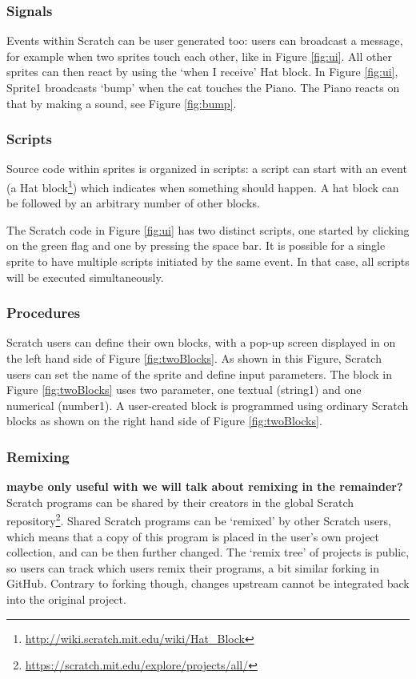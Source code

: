 \documentclass{sig-alternate}
\newcommand{\todo}[1]{\textbf{#1}}
\begin{document}
\subsubsection{Signals}
Events within Scratch can be user generated too: users can broadcast a message, for example when two sprites touch each other, like in Figure \ref{fig:ui}. All other sprites can then react by using the `when I receive' Hat block. In Figure \ref{fig:ui}, Sprite1 broadcasts `bump' when the cat touches the Piano. The Piano reacts on that by making a sound, see Figure \ref{fig:bump}.

\subsubsection{Scripts}
Source code within sprites is organized in scripts: a script can start with an event (a Hat block\footnote{\url{http://wiki.scratch.mit.edu/wiki/Hat_Block}}) which indicates when something should happen. A hat block can be followed by an arbitrary number of other blocks. 

The Scratch code in Figure \ref{fig:ui} has two distinct scripts, one started by clicking on the green flag and one by pressing the space bar. It is possible for a single sprite to have multiple scripts initiated by the same event. In that case, all scripts will be executed simultaneously.

\subsubsection{Procedures}
Scratch users can define their own blocks, with a pop-up screen displayed in on the left hand side of Figure \ref{fig:twoBlocks}. As shown in this Figure, Scratch users can set the name of the sprite and define input parameters. The block in Figure \ref{fig:twoBlocks} uses two parameter, one textual (string1) and one numerical (number1). A user-created block is programmed using ordinary Scratch blocks as shown on the right hand side of Figure \ref{fig:twoBlocks}.

\subsubsection{Remixing}
\todo{maybe only useful with we will talk about remixing in the remainder?}
Scratch programs can be shared by their creators in the global Scratch repository\footnote{\url{https://scratch.mit.edu/explore/projects/all/}}. Shared Scratch programs can be `remixed' by other Scratch users, which means that a copy of this program is placed in the user's own project collection, and can be then further changed. The `remix tree' of projects is public, so users can track which users remix their programs, a bit similar forking in GitHub. Contrary to forking though, changes upstream cannot be integrated back into the original project.
\end{document}
